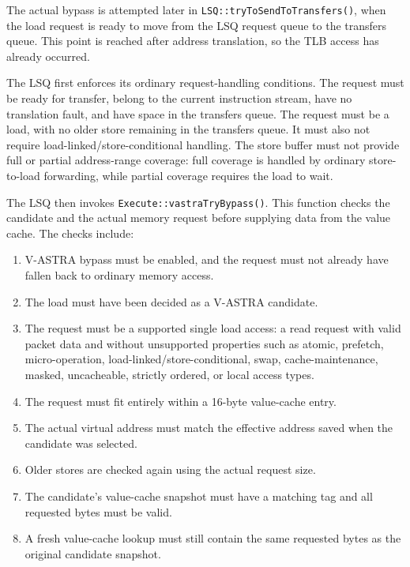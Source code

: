 The actual bypass is attempted later in
\texttt{LSQ::tryToSendToTransfers()}, when the load request
is ready to move from the LSQ request queue to the transfers
queue. This point is reached after address translation, so
the TLB access has already occurred.

The LSQ first enforces its ordinary request-handling conditions.
The request must be ready for transfer, belong to the current
instruction stream, have no translation fault, and have space
in the transfers queue. The request must be a load, with no
older store remaining in the transfers queue. It must also
not require load-linked/store-conditional handling. The store
buffer must not provide full or partial address-range coverage:
full coverage is handled by ordinary store-to-load forwarding,
while partial coverage requires the load to wait.

The LSQ then invokes \texttt{Execute::vastraTryBypass()}.
This function checks the candidate and the actual memory
request before supplying data from the value cache. The checks include:

\begin{enumerate}
    \item V-ASTRA bypass must be enabled, and the request
    must not already have fallen back to ordinary memory access.

    \item The load must have been decided as a V-ASTRA
    candidate.

    \item The request must be a supported single load access:
    a read request with valid packet data and without unsupported
    properties such as atomic, prefetch, micro-operation,
    load-linked/store-conditional, swap, cache-maintenance, masked,
    uncacheable, strictly ordered, or local access types.

    \item The request must fit entirely within a 16-byte
    value-cache entry.

    \item The actual virtual address must match the effective
    address saved when the candidate was selected.

    \item Older stores are checked again using the actual
    request size.

    \item The candidate's value-cache snapshot must have a matching
    tag and all requested bytes must be valid.

    \item A fresh value-cache lookup must still contain the same
    requested bytes as the original candidate snapshot.
\end{enumerate}

